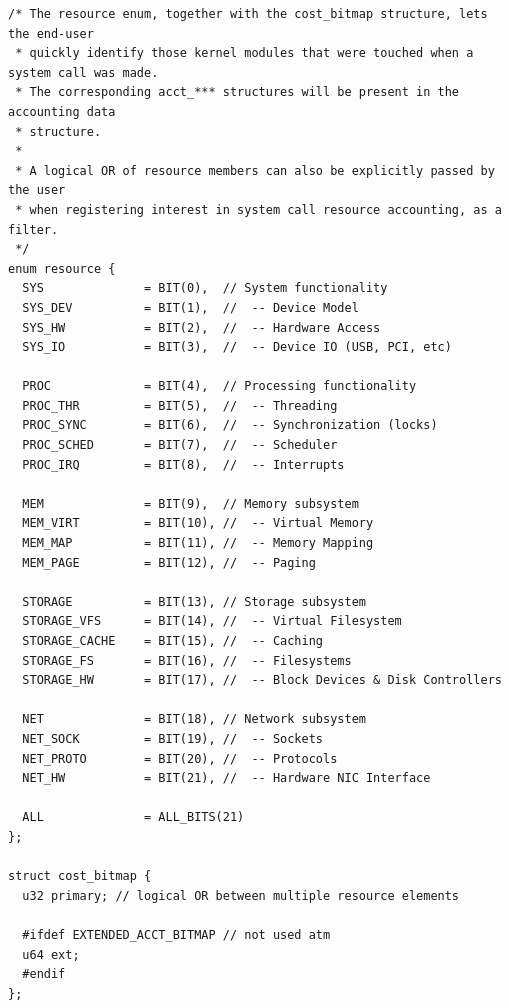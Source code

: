 \documentclass[12pt]{article}
\begin{document}
\vspace{1em}
\begin{lstlisting}
/* The resource enum, together with the cost_bitmap structure, lets the end-user
 * quickly identify those kernel modules that were touched when a system call was made.
 * The corresponding acct_*** structures will be present in the accounting data
 * structure.
 *
 * A logical OR of resource members can also be explicitly passed by the user
 * when registering interest in system call resource accounting, as a filter.
 */
enum resource {
  SYS              = BIT(0),  // System functionality
  SYS_DEV          = BIT(1),  //  -- Device Model
  SYS_HW           = BIT(2),  //  -- Hardware Access
  SYS_IO           = BIT(3),  //  -- Device IO (USB, PCI, etc)

  PROC             = BIT(4),  // Processing functionality
  PROC_THR         = BIT(5),  //  -- Threading
  PROC_SYNC        = BIT(6),  //  -- Synchronization (locks)
  PROC_SCHED       = BIT(7),  //  -- Scheduler
  PROC_IRQ         = BIT(8),  //  -- Interrupts

  MEM              = BIT(9),  // Memory subsystem
  MEM_VIRT         = BIT(10), //  -- Virtual Memory
  MEM_MAP          = BIT(11), //  -- Memory Mapping
  MEM_PAGE         = BIT(12), //  -- Paging

  STORAGE          = BIT(13), // Storage subsystem
  STORAGE_VFS      = BIT(14), //  -- Virtual Filesystem
  STORAGE_CACHE    = BIT(15), //  -- Caching
  STORAGE_FS       = BIT(16), //  -- Filesystems
  STORAGE_HW       = BIT(17), //  -- Block Devices & Disk Controllers

  NET              = BIT(18), // Network subsystem
  NET_SOCK         = BIT(19), //  -- Sockets
  NET_PROTO        = BIT(20), //  -- Protocols
  NET_HW           = BIT(21), //  -- Hardware NIC Interface

  ALL              = ALL_BITS(21)
};

struct cost_bitmap {
  u32 primary; // logical OR between multiple resource elements
  
  #ifdef EXTENDED_ACCT_BITMAP // not used atm
  u64 ext;
  #endif
};
\end{lstlisting}
\end{document}

